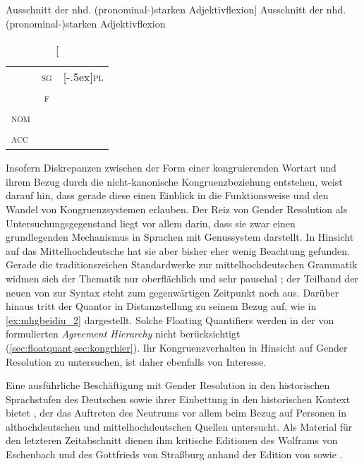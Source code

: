 \begin{table}
\centering
\caption%
	[Ausschnitt der nhd. (pronominal-)starken Adjektivflexion]%
	{Ausschnitt der nhd. (pronominal-)starken Adjektivflexion \autocites[vgl.]%
		[772]{woellstein2022}}
\begin{tabular}{l c c}
	\toprule

		& \textsc{sg}
		& \mr{2}{*}[-.5ex]{\textsc{pl}}
	\\

	\cmidrule(lr){2-2}

		& \textsc{f}
		\\

	\midrule

	\textsc{nom}
		& \cellcolor{black!33}{-e}
		& \cellcolor{black!33}{-e}
		\\
	\textsc{acc}
		& \cellcolor{black!33}{-e}
		& \cellcolor{black!33}{-e}
		\\
	\bottomrule
\end{tabular}
\label{tab:nhd_stradj}
\end{table}

Insofern Diskrepanzen zwischen der Form einer kongruierenden Wortart und ihrem
Bezug durch die nicht-kanonische Kongruenzbeziehung entstehen, weist
\citet[144]{corbett2006} darauf hin, dass gerade diese einen Einblick in die
Funktionsweise und den Wandel von Kongruenz\-systemen erlauben. Der Reiz von
Gender Resolution als Untersuchungsgegenstand liegt vor allem darin, dass sie
zwar einen grundlegenden Mechanismus in Sprachen mit Genussystem darstellt. In
Hinsicht auf das Mittelhochdeutsche hat sie aber bisher eher wenig Beachtung
gefunden. Gerade die traditionsreichen Standard\-werke zur mittelhochdeutschen
Grammatik widmen sich der Thematik nur oberflächlich und sehr pauschal
\autocites(dazu
\cref{ch:forschungsueberblick})[siehe][384]{paul2007}[188]{dal2014}; der
Teilband der neuen  von \citeauthor*{ksw2}
zur Syntax steht zum gegenwärtigen Zeitpunkt noch aus. Darüber hinaus tritt der
Quantor  in Distanzstellung zu seinem Bezug auf, wie in
\cref{ex:mhgbeidiu_2} dargestellt. Solche Floating Quantifiers
\autocite{sportiche1988} werden in der von \citet[204]{corbett1979}
formulierten \textit{Agreement Hierarchy} nicht berücksichtigt
(\cref{sec:floatquant,sec:kongrhier}). Ihr Kongruenzverhalten in Hinsicht auf
Gender Resolution zu untersuchen, ist daher ebenfalls von Interesse.

Eine ausführliche Beschäftigung mit Gender Resolution in den historischen
Sprachstufen des Deutschen sowie ihrer Einbettung in den historischen Kontext
bietet \citet{askedal1973}, der das Auftreten des Neutrums vor allem beim Bezug
auf Personen in althochdeutschen und mittelhochdeutschen Quellen untersucht.
Als Material für den letzteren Zeitabschnitt dienen ihm kritische Editionen des
 Wolframs von Eschenbach und des
 Gottfrieds von Straßburg anhand der
Edition von \citet{lachmannhartl1952} sowie \citet{maroldschroeder1969}.

